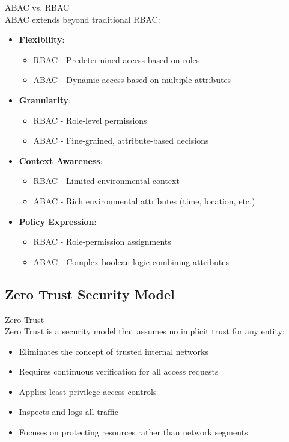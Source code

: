 \begin{concept}{ABAC vs. RBAC}\\
ABAC extends beyond traditional RBAC:
\begin{itemize}
    \item \textbf{Flexibility}:
    \begin{itemize}
        \item RBAC - Predetermined access based on roles
        \item ABAC - Dynamic access based on multiple attributes
    \end{itemize}
    \item \textbf{Granularity}:
    \begin{itemize}
        \item RBAC - Role-level permissions
        \item ABAC - Fine-grained, attribute-based decisions
    \end{itemize}
    \item \textbf{Context Awareness}:
    \begin{itemize}
        \item RBAC - Limited environmental context
        \item ABAC - Rich environmental attributes (time, location, etc.)
    \end{itemize}
    \item \textbf{Policy Expression}:
    \begin{itemize}
        \item RBAC - Role-permission assignments
        \item ABAC - Complex boolean logic combining attributes
    \end{itemize}
\end{itemize}
\end{concept}



\subsection{Zero Trust Security Model}

\begin{definition}{Zero Trust}\\
Zero Trust is a security model that assumes no implicit trust for any entity:
\begin{itemize}
    \item Eliminates the concept of trusted internal networks
    \item Requires continuous verification for all access requests
    \item Applies least privilege access controls
    \item Inspects and logs all traffic
    \item Focuses on protecting resources rather than network segments
\end{itemize}
\end{definition}

